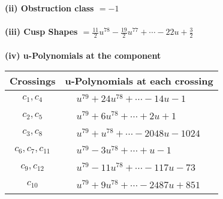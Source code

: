 \documentclass[1p]{elsarticle_modified}
\theoremstyle{definition}
\begin{document}
\flushleft \textbf{(ii) Obstruction class $= -1$}\\~\\
\flushleft \textbf{(iii) Cusp Shapes $= \frac{11}{2} u^{78}-\frac{19}{2} u^{77}+\cdots-22 u+\frac{3}{2}$}\\~\\
\newpage\renewcommand{\arraystretch}{1}
\flushleft \textbf{(iv) u-Polynomials at the component}\newline \\
\begin{tabular}{m{50pt}|m{274pt}}
Crossings & \hspace{64pt}u-Polynomials at each crossing \\
\hline $$\begin{aligned}c_{1},c_{4}\end{aligned}$$&$\begin{aligned}
&u^{79}+24 u^{78}+\cdots-14 u-1
\end{aligned}$\\
\hline $$\begin{aligned}c_{2},c_{5}\end{aligned}$$&$\begin{aligned}
&u^{79}+6 u^{78}+\cdots+2 u+1
\end{aligned}$\\
\hline $$\begin{aligned}c_{3},c_{8}\end{aligned}$$&$\begin{aligned}
&u^{79}+u^{78}+\cdots-2048 u-1024
\end{aligned}$\\
\hline $$\begin{aligned}c_{6},c_{7},c_{11}\end{aligned}$$&$\begin{aligned}
&u^{79}-3 u^{78}+\cdots+u-1
\end{aligned}$\\
\hline $$\begin{aligned}c_{9},c_{12}\end{aligned}$$&$\begin{aligned}
&u^{79}-11 u^{78}+\cdots-117 u-73
\end{aligned}$\\
\hline $$\begin{aligned}c_{10}\end{aligned}$$&$\begin{aligned}
&u^{79}+9 u^{78}+\cdots-2487 u+851
\end{aligned}$\\
\hline
\end{tabular}\\~\\
\end{document}
